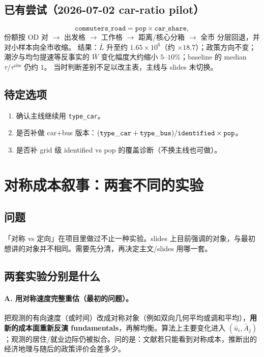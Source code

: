 \documentclass[11pt,a4paper]{article}
\begin{document}
\subsection*{已有尝试（2026-07-02 car-ratio pilot）}
\[
  \texttt{commuters\_road}=\texttt{pop}\times\texttt{car\_share},
\]
份额按 OD 对 $\to$ 出发格 $\to$ 工作格 $\to$ 距离/核心分箱 $\to$ 全市 分层回退，并对小样本向全市收缩。
结果：$\bar L$ 升至约 $1.65\times 10^6$（约 $\times 18.7$）；政策方向不变；潮汐与均匀提速等反事实的 $\bar W$ 变化幅度大约缩小 $5$--$10\%$；baseline 的 median $\tau/\tau^{\mathrm{obs}}$ 仍约 $1$。
当时判断差别不足以改主表，主线与 slides 未切换。

\subsection*{待定选项}
\begin{enumerate}[nosep]
  \item 确认主线继续用 \texttt{type\_car}。
  \item 是否补做 car+bus 版本：$({\tt type\_car}+{\tt type\_bus})/{\tt identified}\times{\tt pop}$。
  \item 是否补 grid 级 identified vs pop 的覆盖诊断（不换主线也可做）。
\end{enumerate}

\section{对称成本叙事：两套不同的实验}
\label{sec:symmetry}

\subsection*{问题}
「对称 vs 定向」在项目里做过不止一种实验。slides 上目前强调的对象，与最初想讲的对象并不相同。需要先分清，再决定主文/slides 用哪一套。

\subsection*{两套实验分别是什么}

\paragraph{A. 用对称速度完整重估（最初的问题）。}
把观测的有向速度（或时间）改成对称对象（例如双向几何平均或调和平均），\textbf{用新的成本面重新反演 fundamentals}，再解均衡。算法上主要变化进入 $(\bar u_i,\bar A_j)$；观测的居住/就业边际仍被拟合。问的是：文献若只能看到对称成本，推断出的经济地理与随后的政策评价会差多少。
\end{document}
